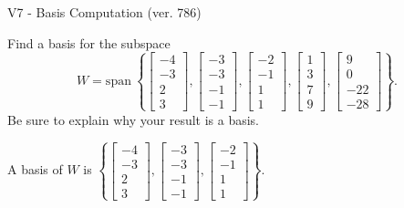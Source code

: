 \begin{exercise}
  \begin{exerciseTitle}V7 - Basis Computation (ver. 786)\end{exerciseTitle}
  \begin{exerciseStatement}
    Find a basis for the subspace 
\[W=\mathrm{span}\ \left\{\left[\begin{array}{r}
-4 \\
-3 \\
2 \\
3
\end{array}\right] , \left[\begin{array}{r}
-3 \\
-3 \\
-1 \\
-1
\end{array}\right] , \left[\begin{array}{r}
-2 \\
-1 \\
1 \\
1
\end{array}\right] , \left[\begin{array}{r}
1 \\
3 \\
7 \\
9
\end{array}\right] , \left[\begin{array}{r}
9 \\
0 \\
-22 \\
-28
\end{array}\right]\right\}.\]
 Be sure to explain why your result is a basis.


  \end{exerciseStatement}
  \begin{exerciseAnswer}
   A basis of \(W\) is  \(\left\{\left[\begin{array}{r}
-4 \\
-3 \\
2 \\
3
\end{array}\right] , \left[\begin{array}{r}
-3 \\
-3 \\
-1 \\
-1
\end{array}\right] , \left[\begin{array}{r}
-2 \\
-1 \\
1 \\
1
\end{array}\right]\right\}\).
  


  \end{exerciseAnswer}
\end{exercise}